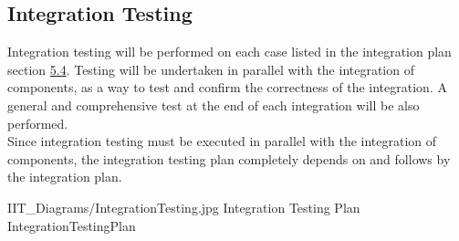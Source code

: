 \documentclass[../DD.tex]{subfiles}
\begin{document}
\subsection{Integration Testing} Integration testing will be performed on each case listed in the integration plan section \hyperref[sect:5.4]{5.4}. Testing will be undertaken in parallel with the integration of components, as a way to test and confirm the correctness of the integration. A general and comprehensive test at the end of each integration will be also performed. \\
Since integration testing must be executed in parallel with the integration of components, the integration testing plan completely depends on and follows by the integration plan.

\image {13cm} {IIT_Diagrams/IntegrationTesting.jpg} {Integration Testing Plan} {IntegrationTestingPlan}

\thispagestyle{fancy}
\end{document}
